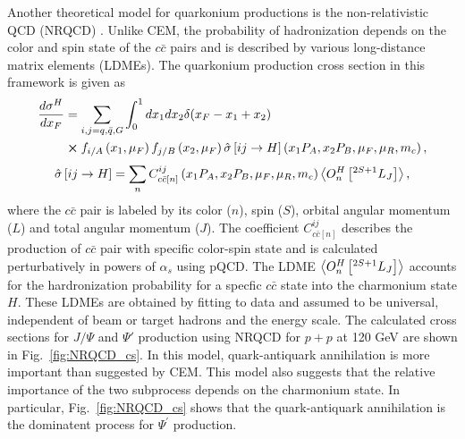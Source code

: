 Another theoretical model for quarkonium productions is the non-relativistic 
QCD (NRQCD) \cite{bodwin1995,bodwin1997}. Unlike CEM, the probability of 
hadronization depends on the color and spin state of the $c\bar{c}$ pairs and 
is described by various long-distance matrix elements (LDMEs). The quarkonium 
production cross section in this framework is given as
\begin{equation}
    \begin{split}
        \frac{d\sigma^H}{dx_F} &=\sum_{i,j = q,\bar{q},G}\int^1_0 dx_1 dx_2 \delta(x_F-x_1+x_2)\\
        &\cross f_{i/A}\left(x_1,\mu_F\right)f_{j/B}\left(x_2,\mu_F\right)\hat{\sigma}\left[ij\rightarrow H\right]\left(x_1P_A,x_2P_B,\mu_F,\mu_R , m_c\right),
    \end{split}
\end{equation}
\begin{equation}
    \hat{\sigma}\left[ij\rightarrow H\right]= \sum_n C^{ij}_{c\bar{c}\left[n\right]}\left(x_1P_A,x_2P_B,\mu_F,\mu_R , m_c\right)\expval{O^H_n \left[^{2S+1}L_J\right]},
\end{equation}
where the $c\bar{c}$ pair is labeled by its color ($n$), spin ($S$), orbital 
angular momentum ($L$) and total angular momentum ($J$). The coefficient 
$C^{ij}_{c\bar{c}\left[n\right]}$ describes the production of $c\bar{c}$ pair 
with specific color-spin state and is calculated perturbatively in powers of 
$\alpha_s$ using pQCD. The LDME $\expval{O^H_n \left[^{2S+1}L_J\right]}$ accounts 
for the hardronization probability for a specfic $c\bar{c}$ state into the 
charmonium state $H$. These LDMEs are obtained by fitting to data and assumed to
be universal, independent of beam or target hadrons and the energy scale. The 
calculated cross sections for $J/\Psi$ and $\Psi'$ production using NRQCD for 
$p+p$ at 120 GeV are shown in Fig.\ \ref{fig:NRQCD_cs}. In this model, quark-antiquark
annihilation is more important than suggested by CEM. This model also suggests 
that the relative importance of the two subprocess depends on the charmonium state. 
In particular, Fig.\ \ref{fig:NRQCD_cs} shows that the quark-antiquark annihilation 
is the dominatent process for $\Psi^\prime$ production.
